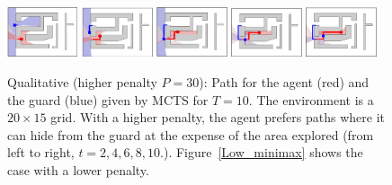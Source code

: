 \documentclass[10 pt, conference]{ieeeconf}
\newcommand{\PT}[1]{{\footnotesize\color{blue}[{\bf PT:} \textsf{#1}]}} %
\begin{document}
\begin{figure}[thb]
\centering
\includegraphics[width=0.185\textwidth]{figs/High2.png}
\includegraphics[width=0.185\textwidth]{figs/High4.png}
\includegraphics[width=0.185\textwidth]{figs/High6.png}
\includegraphics[width=0.185\textwidth]{figs/High8.png}
\includegraphics[width=0.185\textwidth]{figs/High10.png}
\caption{Qualitative (higher penalty $P=30$): Path for the agent (red) and the guard (blue) given by MCTS for $T=10$. The environment is a $20 \times 15$ grid. With a higher penalty, the agent prefers paths where it can hide from the guard at the expense of the area explored (from left to right, $t=2,4,6,8,10$.). Figure~\ref{Low_minimax} shows the case with a lower penalty. 
}  
\label{High_minimax}         
\end{figure}
\end{document}

